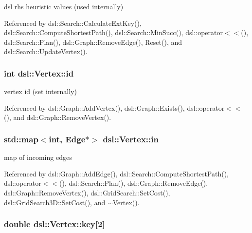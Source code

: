 dsl rhs heuristic values (used internally) 



\-Referenced by dsl\-::\-Search\-::\-Calculate\-Ext\-Key(), dsl\-::\-Search\-::\-Compute\-Shortest\-Path(), dsl\-::\-Search\-::\-Min\-Succ(), dsl\-::operator$<$$<$(), dsl\-::\-Search\-::\-Plan(), dsl\-::\-Graph\-::\-Remove\-Edge(), \-Reset(), and dsl\-::\-Search\-::\-Update\-Vertex().

\subsubsection[{id}]{\setlength{\rightskip}{0pt plus 5cm}int {\bf dsl\-::\-Vertex\-::id}}\label{classdsl_1_1Vertex_ade0c7c448fddd603cdeb8d1775f3ae7a}


vertex id (set internally) 



\-Referenced by dsl\-::\-Graph\-::\-Add\-Vertex(), dsl\-::\-Graph\-::\-Exists(), dsl\-::operator$<$$<$(), and dsl\-::\-Graph\-::\-Remove\-Vertex().

\subsubsection[{in}]{\setlength{\rightskip}{0pt plus 5cm}std\-::map$<$int, {\bf \-Edge}$\ast$$>$ {\bf dsl\-::\-Vertex\-::in}}\label{classdsl_1_1Vertex_a0366cdb27e1674f10b033c5cad9cfe71}


map of incoming edges 



\-Referenced by dsl\-::\-Graph\-::\-Add\-Edge(), dsl\-::\-Search\-::\-Compute\-Shortest\-Path(), dsl\-::operator$<$$<$(), dsl\-::\-Search\-::\-Plan(), dsl\-::\-Graph\-::\-Remove\-Edge(), dsl\-::\-Graph\-::\-Remove\-Vertex(), dsl\-::\-Grid\-Search\-::\-Set\-Cost(), dsl\-::\-Grid\-Search3\-D\-::\-Set\-Cost(), and $\sim$\-Vertex().

\subsubsection[{key}]{\setlength{\rightskip}{0pt plus 5cm}double {\bf dsl\-::\-Vertex\-::key}[2]\hspace{0.3cm}{\ttfamily  [protected]}}\label{classdsl_1_1Vertex_a0ada3f69f585f98e0e3e4a078c979eac}



